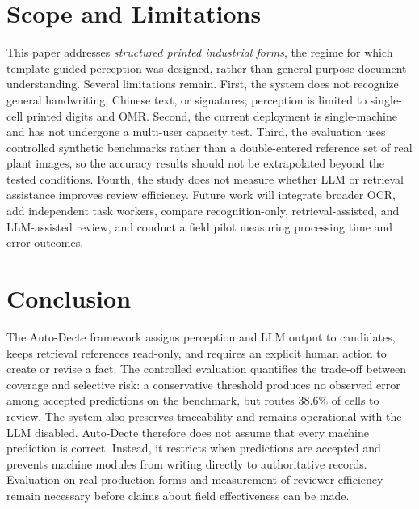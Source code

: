 \documentclass[runningheads]{llncs}
\begin{document}
\section{Scope and Limitations}
This paper addresses \emph{structured printed industrial forms}, the regime for which template-guided perception was designed, rather than general-purpose document understanding. Several limitations remain. First, the system does not recognize general handwriting, Chinese text, or signatures; perception is limited to single-cell printed digits and OMR\@. Second, the current deployment is single-machine and has not undergone a multi-user capacity test. Third, the evaluation uses controlled synthetic benchmarks rather than a double-entered reference set of real plant images, so the accuracy results should not be extrapolated beyond the tested conditions. Fourth, the study does not measure whether LLM or retrieval assistance improves review efficiency. Future work will integrate broader OCR, add independent task workers, compare recognition-only, retrieval-assisted, and LLM-assisted review, and conduct a field pilot measuring processing time and error outcomes.

\section{Conclusion}
The Auto-Decte framework assigns perception and LLM output to candidates, keeps retrieval references read-only, and requires an explicit human action to create or revise a fact. The controlled evaluation quantifies the trade-off between coverage and selective risk: a conservative threshold produces no observed error among accepted predictions on the benchmark, but routes 38.6\% of cells to review. The system also preserves traceability and remains operational with the LLM disabled. Auto-Decte therefore does not assume that every machine prediction is correct. Instead, it restricts when predictions are accepted and prevents machine modules from writing directly to authoritative records. Evaluation on real production forms and measurement of reviewer efficiency remain necessary before claims about field effectiveness can be made.
\end{document}
